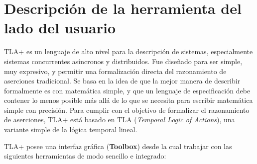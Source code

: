 \documentclass[spanish]{llncs}
\begin{document}
\section{Descripción de la herramienta del lado del usuario}
TLA+ es un lenguaje de alto nivel para la descripción de sistemas, especialmente sistemas concurrentes asíncronos y distribuidos. 
Fue diseñado para ser simple, muy expresivo, y permitir una formalización directa del razonamiento de aserciones tradicional.
Se basa en la idea de que la mejor manera de describir formalmente es con matemática simple, y que un lenguaje de especificación debe contener lo menos posible más allá de lo que se necesita para escribir matemática simple con precisión. Para cumplir con el objetivo de formalizar el razonamiento de aserciones, TLA+ está basado en TLA (\textit{Temporal Logic of Actions}), una variante simple de la lógica temporal lineal.

TLA+ posee una interfaz gráfica (\textbf{Toolbox}) desde la cual trabajar con las siguientes herramientas de modo sencillo e integrado:
\end{document}
